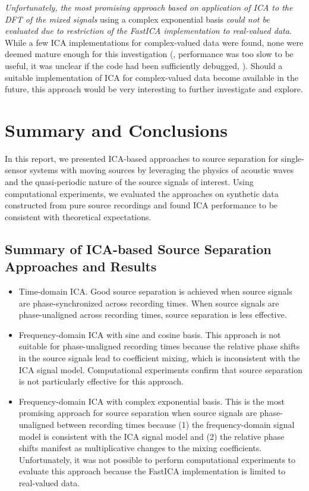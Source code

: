 \documentclass[10pt]{article}
\begin{document}
\emph{Unfortunately, the most promising approach based on application of ICA to the DFT
of the mixed signals} using a complex exponential basis \emph{could not be evaluated due to
restriction of the}  \emph{FastICA implementation to real-valued data}.
While a few ICA implementations for complex-valued data were found, none were deemed mature
enough for this investigation (\eg, performance was too slow to be useful, it was unclear
if the code had been sufficiently debugged, \etc).  Should a suitable implementation of
ICA for complex-valued data become available in the future, this approach would be very
interesting to further investigate and explore.


\section{Summary and Conclusions}
In this report, we presented ICA-based approaches to source separation for single-sensor
systems with moving sources by leveraging the physics of acoustic waves and the
quasi-periodic nature of the source signals of interest. Using computational experiments,
we evaluated the approaches on synthetic data constructed from pure source recordings and
found ICA performance to be consistent with theoretical expectations.

\subsection*{Summary of ICA-based Source Separation Approaches and Results}
\begin{itemize}
    \item Time-domain ICA. Good source separation is achieved when source signals are
        phase-synchronized across recording times. When source signals are phase-unaligned
        across recording times, source separation is less effective.

    \item Frequency-domain ICA with sine and cosine basis. This approach is not suitable
        for phase-unaligned recording times because the relative phase shifts in the
        source signals lead to coefficient mixing, which is inconsistent with the ICA
        signal model. Computational experiments confirm that source separation is not
        particularly effective for this approach.

    \item Frequency-domain ICA with complex exponential basis. This is the most promising
        approach for source separation when source signals are phase-unaligned between
        recording times because (1) the frequency-domain signal model is consistent with
        the ICA signal model and (2) the relative phase shifts manifest as multiplicative
        changes to the mixing coefficients. Unfortunately, it was not possible to perform
        computational experiments to evaluate this approach because the 
        FastICA implementation is limited to real-valued data.
\end{itemize}
\end{document}

